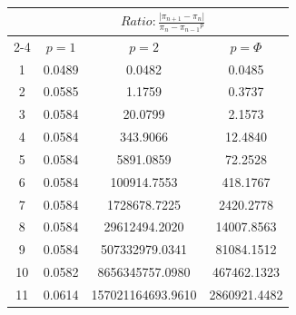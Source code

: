 \documentclass{article}
\providecommand{\abs}[1]{\lvert#1\rvert}
\begin{document}
\begin{tabular}{|c|c|c|c|}
\hline
\n & \multicolumn{3}{|c|}{$Ratio:\displaystyle\frac{\abs{\pi_{n+1}-\pi_{n}}}{{\pi_{n}-\pi_{n-1}}^p}$} \\
\cline{2-4}
 & $p=1$ & $p=2$ & $p=\Phi$ \\
\hline
 1 & 0.0489 & 0.0482 & 0.0485 \\ 
  2 & 0.0585 & 1.1759 & 0.3737 \\ 
  3 & 0.0584 & 20.0799 & 2.1573 \\ 
  4 & 0.0584 & 343.9066 & 12.4840 \\ 
  5 & 0.0584 & 5891.0859 & 72.2528 \\ 
  6 & 0.0584 & 100914.7553 & 418.1767 \\ 
  7 & 0.0584 & 1728678.7225 & 2420.2778 \\ 
  8 & 0.0584 & 29612494.2020 & 14007.8563 \\ 
  9 & 0.0584 & 507332979.0341 & 81084.1512 \\ 
 10 & 0.0582 & 8656345757.0980 & 467462.1323 \\ 
 11 & 0.0614 & 157021164693.9610 & 2860921.4482 \\ 
 \hline 
\end{tabular}
\end{document}
